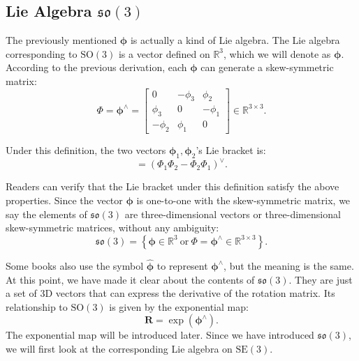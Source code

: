 \subsection{Lie Algebra $\mathfrak{so}(3)$}
The previously mentioned $\boldsymbol{\phi}$ is actually a kind of Lie algebra. The Lie algebra corresponding to $\mathrm{SO}(3)$ is a vector defined on $\mathbb{R}^3$, which we will denote as $\boldsymbol{\phi}$. According to the previous derivation, each $\boldsymbol{\phi}$ can generate a skew-symmetric matrix:
\begin{equation}
\label{eq:phi}
\boldsymbol{\varPhi} = \boldsymbol{\phi}^{\wedge} = \left[ {\begin{array}{*{20}{c}}
    0&{ - {\phi _3}}&{{\phi _2}}\\
    {{\phi _3}}&0&{ - {\phi _1}}\\
    { - {\phi _2}}&{{\phi _1}}&0
    \end{array}} \right] \in \mathbb{R}^{3 \times 3}.
\end{equation}

Under this definition, the two vectors $\boldsymbol{\phi}_1, \boldsymbol{\phi}_2$'s Lie bracket is:
\begin{equation}
[\boldsymbol{\phi}_1, \boldsymbol{\phi}_2] = \left( \mathbf{ \varPhi }_1 \mathbf{ \varPhi }_2 - \mathbf{ \varPhi }_2 \mathbf{ \varPhi }_1 \right)^\vee.
\end{equation}

Readers can verify that the Lie bracket under this definition satisfy the above properties. Since the vector $\boldsymbol{\phi}$ is one-to-one with the skew-symmetric matrix, we say the elements of $\mathfrak{so}(3)$ are three-dimensional vectors or three-dimensional skew-symmetric matrices, without any ambiguity:
\begin{equation}
\mathfrak{so}(3) = \left\{ \boldsymbol{\phi} \in \mathbb{R}^3 \ \text{or}\  \boldsymbol{\varPhi} = \boldsymbol{\phi^\wedge} \in \mathbb{ R}^{3 \times 3} \right\}.
\end{equation}

Some books also use the symbol $\widehat{\boldsymbol{\phi}}$ to represent $\boldsymbol{\phi}^\wedge$, but the meaning is the same. At this point, we have made it clear about the contents of $\mathfrak{so}(3)$. They are just a set of 3D vectors that can express the derivative of the rotation matrix. Its relationship to $\mathrm{SO}(3)$ is given by the exponential map:
\begin{equation}
\mathbf{R} = \exp ( \boldsymbol{\phi}^\wedge ).
\end{equation}
The exponential map will be introduced later. Since we have introduced $\mathfrak{so}(3)$, we will first look at the corresponding Lie algebra on $\mathrm{SE}(3)$.

